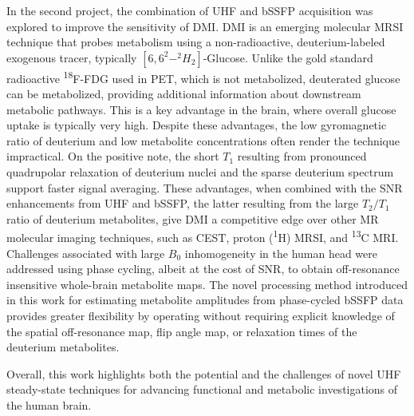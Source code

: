 In the second project, the combination of \gls{UHF} and \gls{bSSFP} acquisition was explored to improve the sensitivity of \gls{DMI}. \Gls{DMI} is an emerging molecular \gls{MRSI} technique that probes metabolism using a non-radioactive, deuterium-labeled exogenous tracer, typically $[6,6^2-^2H_2]$-Glucose. Unlike the gold standard radioactive \textsuperscript{18}F-FDG used in \gls{PET}, which is not metabolized, deuterated glucose can be metabolized, providing additional information about downstream metabolic pathways. This is a key advantage in the brain, where overall glucose uptake is typically very high. Despite these advantages, the low gyromagnetic ratio of deuterium and low metabolite concentrations often render the technique impractical. On the positive note, the short $T_1$ resulting from pronounced quadrupolar relaxation of deuterium nuclei and the sparse deuterium spectrum support faster signal averaging. These advantages, when combined with the \gls{SNR} enhancements from \gls{UHF} and \gls{bSSFP}, the latter resulting from the large $T_2/T_1$ ratio of deuterium metabolites, give \gls{DMI} a competitive edge over other MR molecular imaging techniques, such as \gls{CEST}, proton (\textsuperscript{1}H) \gls{MRSI}, and \textsuperscript{13}C MRI. Challenges associated with large $B_0$ inhomogeneity in the human head were addressed using phase cycling, albeit at the cost of SNR, to obtain off-resonance insensitive whole-brain metabolite maps. The novel processing method introduced in this work for estimating metabolite amplitudes from phase-cycled \gls{bSSFP} data provides greater flexibility by operating without requiring explicit knowledge of the spatial off-resonance map, flip angle map, or relaxation times of the deuterium metabolites.

Overall, this work highlights both the potential and the challenges of novel \gls{UHF} steady-state techniques for advancing functional and metabolic investigations of the human brain.
